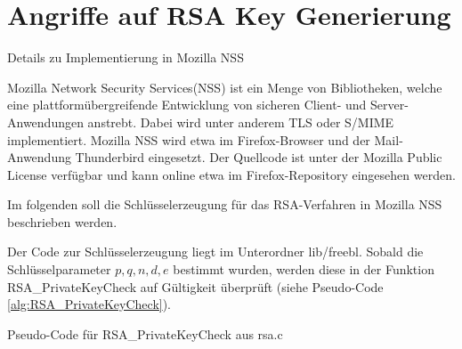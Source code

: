 \section{Angriffe auf RSA Key Generierung}

Details zu Implementierung in Mozilla NSS

Mozilla Network Security Services(NSS) ist ein Menge von Bibliotheken, welche eine plattformübergreifende Entwicklung von sicheren Client- und Server-Anwendungen anstrebt. Dabei wird unter anderem TLS oder S/MIME implementiert. Mozilla NSS wird etwa im Firefox-Browser und der Mail-Anwendung Thunderbird eingesetzt.
Der Quellcode ist unter der Mozilla Public License verfügbar und kann online etwa im Firefox-Repository \cite{MozillaDXR} eingesehen werden.

Im folgenden soll die Schlüsselerzeugung für das RSA-Verfahren in Mozilla NSS beschrieben werden.

Der Code zur Schlüsselerzeugung liegt im Unterordner lib/freebl. Sobald die Schlüsselparameter $p,q,n,d,e$ bestimmt wurden, werden diese in der Funktion RSA_PrivateKeyCheck auf Gültigkeit überprüft (siehe Pseudo-Code \ref{alg:RSA_PrivateKeyCheck}).

\begin{algorithm}[h]
\DontPrintSemicolon
\caption{Pseudo-Code für RSA_PrivateKeyCheck aus rsa.c}
\label{alg:RSA_PrivateKeyCheck}

\end{algorithm}


%

